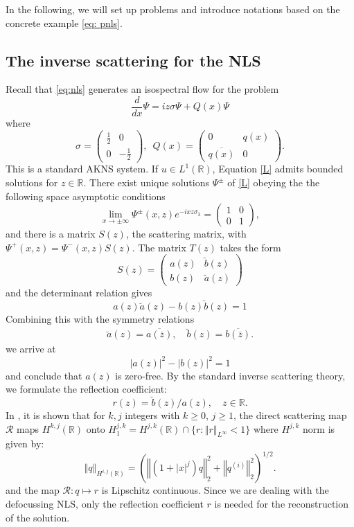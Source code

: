 \documentclass{amsart}
\theoremstyle{plain}
\theoremstyle{remark}
\numberwithin{equation}{section}
\newcommand{\norm}[2]{\left\Vert #1\right\Vert_{#2}}
\newcommand{\ba}{\breve{a}}
\newcommand{\bb}{\breve{b}}
\newcommand{\bbR}{\mathbb{R}}
\newcommand{\zbar}{\overline{z}}
\newcommand{\twomat}[4]
{
\left(
	\begin{array}{cc}
		{#1}	&	{#2}	\\[10pt]
		{#3}	&	{#4}
		\end{array}
\right)
}
\newcommand{\diagmat}[2]
{
\left(
	\begin{array}{cc}
		{#1}	&	0	\\
		0		&	{#2}
		\end{array}
\right)
}
\newcommand{\offdiagmat}[2]
{
\left(
	\begin{array}{cc}
		0			&		{#1} 	\\
		{#2}		&		0
		\end{array}
\right)
}
\begin{document}
In the following, we will set up problems and introduce notations based on the concrete example \eqref{eq: pnls}.



\subsection{The inverse scattering for the NLS}
Recall that \eqref{eq:nls} generates an isospectral flow for the problem
\begin{equation}
\label{L}
\frac{d}{dx} \Psi = iz \sigma \Psi + Q(x) \Psi
\end{equation}
where
$$ \sigma= \diagmat{\frac{1}{2}}{-\frac{1}{2}}, \,\,\, Q(x) = \offdiagmat{q(x)}{\overline{q(x)}}.$$
This is a standard AKNS system. If $u \in L^1(\bbR) $, Equation \eqref{L} admits bounded 
solutions for $z \in \mathbb{R}$.   There exist unique solutions $\Psi^\pm$ of \eqref{L} obeying the the following space asymptotic conditions
$$\lim_{x \to \pm \infty} \Psi^\pm(x,z) e^{-ix z \sigma_3} = \diagmat{1}{1},$$
and there is a matrix $S(z)$, the scattering matrix, with 
 $\Psi^+(x,z)=\Psi^-(x,z) S(z)$.
The matrix $T(z)$ takes the form
\begin{equation} \label{matrixT}
 S(z) = \twomat{a(z)}{\bb(z)}{b(z)}{\ba(z)} 
 \end{equation}
and  the determinant relation gives
$$ a(z)\ba(z) - b(z)\bb(z) = 1 $$
Combining this with the symmetry relations 
\begin{align} \label{symmetry}
\ba(z)=\overline{a( \zbar )}, \quad \bb(z) = \overline{ b(\zbar)}. 
\end{align}
we arrive at
$$|a(z)|^2-|b(z)|^2=1$$
and conclude that $a(z)$ is zero-free. By the standard inverse scattering theory, we formulate the reflection coefficient:
\begin{equation}
\label{reflection}
r(z)=\bb(z)/a(z), \quad z\in\bbR.
\end{equation}
In \cite{Zhou98}, it is shown that for $k, j$ integers with $k\geq 0$, $j\geq 1$, the direct scattering map $\mathcal{R}$ maps $H^{k,j}(\bbR)$ onto $H^{j,k}_1=H^{j,k}(\bbR)\cap \lbrace r: \norm{r}{L^\infty} <1\rbrace$ where $H^{j,k}$ norm is given by:
\begin{equation}
\label{sp: weighted}
    \norm{q}{H^{i,j}(\bbR)}
= \left( \norm{(1+|x|^j)q}{2}^2 + \norm{q^{(i)}}{2}^2 \right)^{1/2}. 
\end{equation}
and the map $\mathcal{R}: q\mapsto r$ is Lipschitz continuous. Since we are dealing with the defocussing NLS, only the reflection coefficient $r$ is needed for the reconstruction of the solution. 
\end{document}
